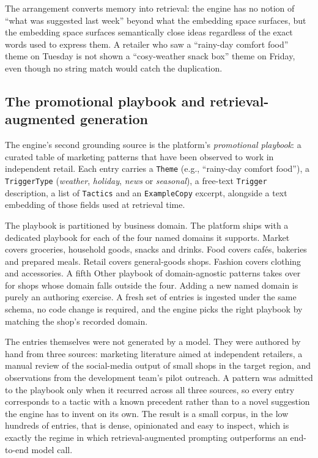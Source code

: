 The arrangement converts memory into retrieval: the engine has no notion of ``what was suggested last week'' beyond what the embedding space surfaces, but the embedding space surfaces semantically close ideas regardless of the exact words used to express them. A retailer who saw a ``rainy-day comfort food'' theme on Tuesday is not shown a ``cosy-weather snack box'' theme on Friday, even though no string match would catch the duplication.

\subsection{The promotional playbook and retrieval-augmented generation}
\label{subsec:rec-playbook}

The engine's second grounding source is the platform's \emph{promotional playbook}: a curated table of marketing patterns that have been observed to work in independent retail. Each entry carries a \texttt{Theme} (e.g., ``rainy-day comfort food''), a \texttt{TriggerType} (\emph{weather}, \emph{holiday}, \emph{news} or \emph{seasonal}), a free-text \texttt{Trigger} description, a list of \texttt{Tactics} and an \texttt{ExampleCopy} excerpt, alongside a text embedding of those fields used at retrieval time.

The playbook is partitioned by business domain. The platform ships with a dedicated playbook for each of the four named domains it supports. Market covers groceries, household goods, snacks and drinks. Food covers caf\'es, bakeries and prepared meals. Retail covers general-goods shops. Fashion covers clothing and accessories. A fifth Other playbook of domain-agnostic patterns takes over for shops whose domain falls outside the four. Adding a new named domain is purely an authoring exercise. A fresh set of entries is ingested under the same schema, no code change is required, and the engine picks the right playbook by matching the shop's recorded domain.

The entries themselves were not generated by a model. They were authored by hand from three sources: marketing literature aimed at independent retailers, a manual review of the social-media output of small shops in the target region, and observations from the development team's pilot outreach. A pattern was admitted to the playbook only when it recurred across all three sources, so every entry corresponds to a tactic with a known precedent rather than to a novel suggestion the engine has to invent on its own. The result is a small corpus, in the low hundreds of entries, that is dense, opinionated and easy to inspect, which is exactly the regime in which retrieval-augmented prompting outperforms an end-to-end model call.

